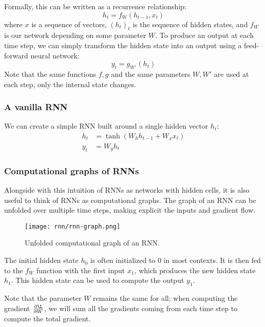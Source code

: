 Formally, this can be written as a recurrence relationship:
\begin{equation*}
    h_t = f_W(h_{t-1}, x_t)
\end{equation*}
where $x$ is a sequence of vectors, $(h_t)_t$ is the sequence of hidden states, and $f_W$ is our network depending on some parameter $W$. To produce an output at each time step, we can simply transform the hidden state into an output using a feed-forward neural network:
\begin{equation*}
    y_t = g_{W'}(h_t)
\end{equation*}
Note that the same functions $f, g$ and the same parameters $W, W'$ are used at each step, only the internal state changes.

\subsubsection{A vanilla RNN}
We can create a simple RNN built around a single hidden vector $h_t$:
\begin{equation*}
    \begin{aligned}
        h_t &= \tanh\left(W_h h_{t-1} + W_x x_t\right)\\
        y_t &= W_y h_t
    \end{aligned}
\end{equation*}

\subsubsection{Computational graphs of RNNs}
Alongside with this intuition of RNNs as networks with hidden cells, it is also useful to think of RNNs as computational graphs. The graph of an RNN can be unfolded over multiple time steps, making explicit the inputs and gradient flow.
\begin{figure}[H]
    \centering
    \texttt{[image: rnn/rnn-graph.png]}
    \caption{Unfolded computational graph of an RNN.}
\end{figure}
The initial hidden state $h_0$ is often initialized to 0 in most contexts. It is then fed to the $f_W$ function with the first input $x_1$, which produces the new hidden state $h_1$. This hidden state can be used to compute the output $y_1$.

Note that the parameter $W$ remains the same for all; when computing the gradient $\frac{\partial\L}{\partial W}$, we will sum all the gradients coming from each time step to compute the total gradient.

